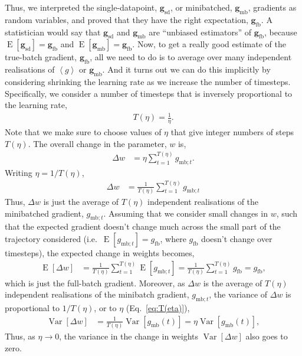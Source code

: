 \documentclass{article}
\newcommand{\bracket}[3]{\left#1 #3 \right#2}
\newcommand{\sqb}{\bracket{[}{]}}
\newcommand{\ab}{\bracket{\langle}{\rangle}}
\newcommand{\0}{\mathbf{0}}
\newcommand{\g}{\mathbf{g}}
\newcommand{\gfb}{\g_\text{fb}}
\newcommand{\gmb}{\g_\text{mb}}
\newcommand{\gsmbt}{g_{\text{mb}; t}}
\newcommand{\gsfb}{g_\text{fb}}
\newcommand{\gsmb}{g_\text{mb}}
\newcommand{\gsd}{\g_\text{sd}}
\newcommand{\gsb}{\ab{g}}
\newcommand{\E}{\operatorname{E}\sqb}
\newcommand{\Var}{\operatorname{Var}\sqb}
\begin{document}
Thus, we interpreted the single-datapoint, $\gsd$, or minibatched, $\gmb$, gradients as random variables, and proved that they have the right expectation, $\gfb$.
A statistician would say that $\gsd$ and $\gmb$ are ``unbiased estimators'' of $\gfb$, because $\E{\gsd} = \gfb$ and $\E{\gmb} = \gfb$.
Now, to get a really good estimate of the true-batch gradient, $\gfb$, all we need to do is to average over many independent realisations of $\gsb$ or $\gmb$.
And it turns out we can do this implicitly by considering shrinking the learning rate as we increase the number of timesteps.
Specifically, we consider a number of timesteps that is inversely proportional to the learning rate,
\begin{align}
  \label{eq:T(eta)}  
  T(\eta) = \tfrac{1}{\eta}.
\end{align}
Note that we make sure to choose values of $\eta$ that give integer numbers of steps $T(\eta)$.
The overall change in the parameter, $w$ is,
\begin{align}
  \Delta w &= \eta \sum_{t=1}^{T(\eta)} \gsmbt.
\end{align}
Writing $\eta = 1/T(\eta)$,
\begin{align}
  \Delta w &= \frac{1}{T(\eta)} \sum_{t=1}^{T(\eta)} \gsmbt
\end{align}
Thus, $\Delta w$ is just the average of $T(\eta)$ independent realisations of the minibatched gradient, $\gsmbt$.
Assuming that we consider small changes in $w$, such that the expected gradient doesn't change much across the small part of the trajectory considered (i.e.\ $\E{\gsmbt} = \gsfb$, where $\gsfb$ doesn't change over timesteps), the expected change in weights becomes,
\begin{align}
  \E{\Delta w} &= \frac{1}{T(\eta)} \sum_{t=1}^{T(\eta)} \E{\gsmbt} = \frac{1}{T(\eta)} \sum_{t=1}^{T(\eta)} \gsfb = \gsfb,
\end{align}
which is just the full-batch gradient.
Moreover, as $\Delta w$ is the average of $T(\eta)$ independent realisations of the minibatch gradient, $\gsmbt$, the variance of $\Delta w$ is proportional to $1/T(\eta)$, or to $\eta$ (Eq.~\ref{eq:T(eta)}),
\begin{align}
  \Var{\Delta w} &= \tfrac{1}{T(\eta)} \Var{\gsmb(t)} = \eta \Var{\gsmb(t)},
\end{align}
Thus, as $\eta \rightarrow 0$, the variance in the change in weights $\Var{\Delta w}$ also goes to zero.
%
\end{document}
